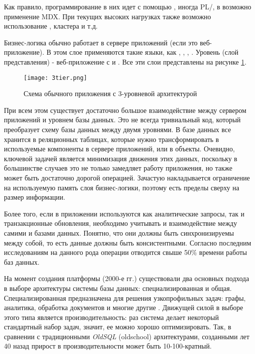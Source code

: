 Как правило, программирование в них идет с помощью \sql, иногда PL/\sql, в \olap возможно применение MDX. При текущих высоких нагрузках также возможно использование \nosql, \hadoop кластера и т.д.

Бизнес-логика обычно работает в сервере приложений (если это веб-приложение). В этом слое применяются такие языки, как \java, \csharp, \python, \scala.
Уровень \ui (слой представления) - веб-приложение с \html и \js. Все эти слои представлены на рисунке \ref{fig:technology:logicblox:three_tier_architecture}.

\begin{figure}
	\centering
	\texttt{[image: 3tier.png]}
	\caption{Схема обычного приложения с 3-уровневой архитектурой}
	\label{fig:technology:logicblox:three_tier_architecture}
\end{figure}

При всем этом существует достаточно большое взаимодействие между сервером приложений и уровнем базы данных. Это не всегда тривиальный код, который преобразует схему базы данных между двумя уровнями. В базе данных все хранится в реляционных таблицах, которые нужно трансформировать в используемые компоненты в сервере приложений, или в объекты. Очевидно, ключевой задачей является минимизация движения этих данных, поскольку в большинстве случаев это не только замедляет работу приложения, но также может быть достаточно дорогой операцией. Зачастую накладывается ограничение на используемую память слоя бизнес-логики, поэтому есть пределы сверху на размер информации.

Более того, если в приложении используются как аналитические запросы, так и транзакционные обновления, необходимо учитывать и взаимодействие между самими \olap и \oltp базами данных. Понятно, что они должны быть синхронизируемы между собой, то есть данные должны быть консистентными. Согласно последним исследованиям на данного рода операции отводится свыше 50\% времени работы баз данных.

На момент создания платформы (2000-е гг.) существовали два основных подхода в выборе архитектуры системы базы данных: специализированная и общая. Специализированная предназначена для решения узкопрофильных задач: графы, аналитика, обработка документов и многие другие \cite{one_size_fits_all}. Движущей силой в выборе этого типа является производительность: раз система делает некоторый стандартный набор задач, значит, ее можно хорошо оптимизировать. Так, в сравнении с традиционными \emph{OldSQL} (oldschool) архитектурами, созданными лет 40 назад прирост в производительности может быть 10-100-кратный.

